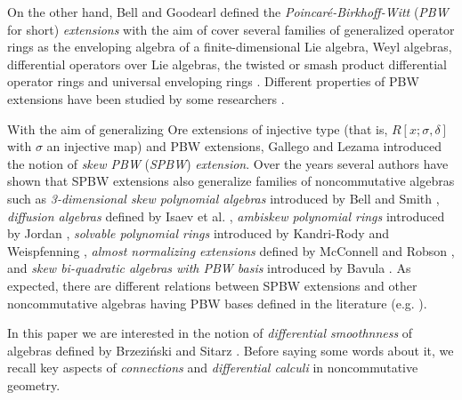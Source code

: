 \documentclass{amsart}
\theoremstyle{definition}
\theoremstyle{remark}
\numberwithin{equation}{section}
\begin{document}
On the other hand, Bell and Goodearl \cite{BellGoodearl1988} defined the {\em Poincar\'e-Birkhoff-Witt} ({\em PBW} for short) {\em extensions} with the aim of cover several families of generalized operator rings as the enveloping algebra of a finite-dimensional Lie algebra, Weyl algebras, differential operators over Lie algebras, the twisted or smash product differential operator rings and universal enveloping rings \cite[Section 5]{BellGoodearl1988}. Different properties of PBW extensions have been studied by some researchers \cite{AkalanMarubayashi2016, Giesbrechtetal2002, Giesbrechtetal2014, Goodearl1990, MarubayashiZhang1996, Matczuk1988, SeilerBook2010, Tumwesigyeetal2020}.

With the aim of generalizing Ore extensions of injective type (that is, $R[x; \sigma, \delta]$ with $\sigma$ an injective map) and PBW extensions, Gallego and Lezama \cite{GallegoLezama2010} introduced the notion of {\em skew PBW} ({\em SPBW}) {\em extension}. Over the years several authors have shown that SPBW extensions also generalize families of noncommutative algebras such as {\em 3-dimensional skew polynomial algebras} introduced by Bell and Smith \cite{BellSmith1990}, {\em diffusion algebras} defined by Isaev et al. \cite{IsaevPyatovRittenberg2001, PyatovTwarock2002}, {\em ambiskew polynomial rings} introduced by Jordan \cite{Jordan2000, JordanWells1996}, {\em solvable polynomial rings} introduced by Kandri-Rody and Weispfenning  \cite{KandryWeispfenning1990}, {\em almost normalizing extensions} defined by McConnell and Robson \cite{McConnellRobson2001}, and {\em skew bi-quadratic algebras with PBW basis} introduced by Bavula \cite{Bavula2023}. As expected, there are different relations between SPBW extensions and other noncommutative algebras having PBW bases defined in the literature (e.g. \cite{Apel1988, Bavula2020, BuesoTorrecillasVerschoren2003, GomezTorrecillas2014, Levandovskyy2005, Li2002, McConnellRobson2001, Rosenberg1995, SeilerBook2010}). 

In this paper we are interested in the notion of {\em differential smoothnness} of algebras defined by Brzezi{\'n}ski and Sitarz \cite{BrzezinskiSitarz2017}. Before saying some words about it, we recall key aspects of {\em connections} and {\em differential calculi} in noncommutative geometry.
\end{document}

